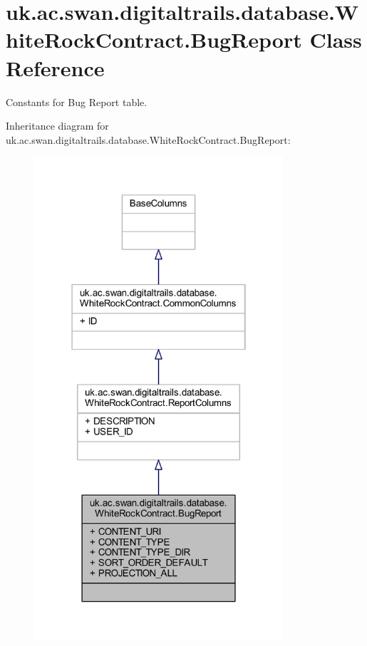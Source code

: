 \hypertarget{classuk_1_1ac_1_1swan_1_1digitaltrails_1_1database_1_1_white_rock_contract_1_1_bug_report}{\section{uk.\+ac.\+swan.\+digitaltrails.\+database.\+White\+Rock\+Contract.\+Bug\+Report Class Reference}
\label{classuk_1_1ac_1_1swan_1_1digitaltrails_1_1database_1_1_white_rock_contract_1_1_bug_report}
}


Constants for Bug Report table.  




Inheritance diagram for uk.\+ac.\+swan.\+digitaltrails.\+database.\+White\+Rock\+Contract.\+Bug\+Report\+:
\nopagebreak
\begin{figure}[H]
\begin{center}
\leavevmode
\includegraphics[width=262pt]{classuk_1_1ac_1_1swan_1_1digitaltrails_1_1database_1_1_white_rock_contract_1_1_bug_report__inherit__graph}
\end{center}
\end{figure}


